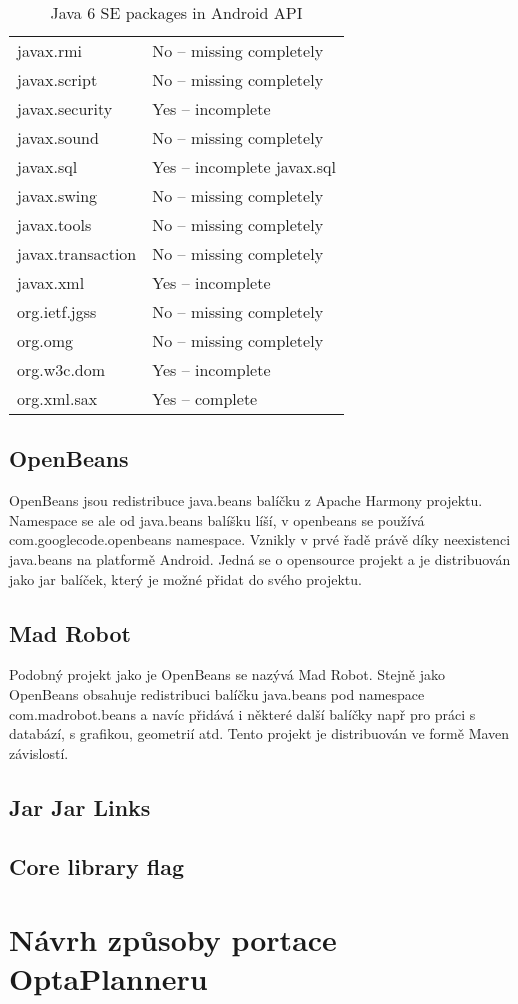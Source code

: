 \begin {table}[h!]
\begin{tabular}{|l|l|}
javax.rmi		        & No -- missing completely    \\
javax.script	        & No -- missing completely    \\
javax.security          & Yes -- incomplete            \\
javax.sound             & No -- missing completely    \\
javax.sql	            & Yes -- incomplete javax.sql  \\
javax.swing	            & No -- missing completely    \\
javax.tools	            & No -- missing completely    \\
javax.transaction	    & No -- missing completely    \\
javax.xml	            & Yes -- incomplete            \\
org.ietf.jgss	        & No -- missing completely    \\
org.omg                 & No -- missing completely    \\
org.w3c.dom             & Yes -- incomplete            \\
org.xml.sax	            & Yes -- complete              \\
\hline
\end{tabular}
\centering
\caption{Java 6 SE packages in Android API}
\end{table}


\subsection{OpenBeans}
OpenBeans jsou redistribuce java.beans balíčku z Apache Harmony projektu. Namespace se ale od java.beans balíšku líší, v openbeans se používá com.googlecode.openbeans namespace. Vznikly v prvé řadě právě díky neexistenci java.beans na platformě Android. Jedná se o opensource projekt a je distribuován jako jar balíček, který je možné přidat do svého projektu.

\subsection{Mad Robot}
Podobný projekt jako je OpenBeans se nazývá Mad Robot. Stejně jako OpenBeans obsahuje redistribuci balíčku java.beans pod namespace com.madrobot.beans a navíc přidává i některé další balíčky např pro práci s databází, s grafikou, geometrií atd. Tento projekt je distribuován ve formě Maven závislostí.

\subsection{Jar Jar Links}


\subsection{Core library flag}

\section{Návrh způsoby portace OptaPlanneru}
\subsection{}



